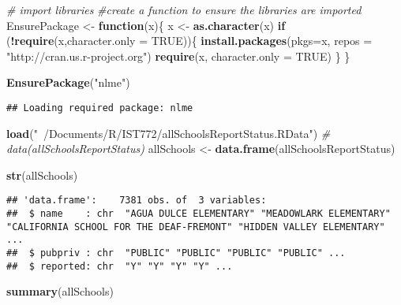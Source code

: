 \documentclass[]{article}
\newenvironment{Shaded}{\begin{snugshade}}{\end{snugshade}}
\newcommand{\CommentTok}[1]{\textcolor[rgb]{0.56,0.35,0.01}{\textit{#1}}}
\newcommand{\ControlFlowTok}[1]{\textcolor[rgb]{0.13,0.29,0.53}{\textbf{#1}}}
\newcommand{\DataTypeTok}[1]{\textcolor[rgb]{0.13,0.29,0.53}{#1}}
\newcommand{\KeywordTok}[1]{\textcolor[rgb]{0.13,0.29,0.53}{\textbf{#1}}}
\newcommand{\NormalTok}[1]{#1}
\newcommand{\OperatorTok}[1]{\textcolor[rgb]{0.81,0.36,0.00}{\textbf{#1}}}
\newcommand{\OtherTok}[1]{\textcolor[rgb]{0.56,0.35,0.01}{#1}}
\newcommand{\StringTok}[1]{\textcolor[rgb]{0.31,0.60,0.02}{#1}}
\begin{document}
\begin{Shaded}
\begin{Highlighting}[]
\CommentTok{# import libraries }
\CommentTok{#create a function to ensure the libraries are imported}
\NormalTok{EnsurePackage <-}\StringTok{ }\ControlFlowTok{function}\NormalTok{(x)\{}
\NormalTok{  x <-}\StringTok{ }\KeywordTok{as.character}\NormalTok{(x)}
    \ControlFlowTok{if}\NormalTok{ (}\OperatorTok{!}\KeywordTok{require}\NormalTok{(x,}\DataTypeTok{character.only =} \OtherTok{TRUE}\NormalTok{))\{}
      \KeywordTok{install.packages}\NormalTok{(}\DataTypeTok{pkgs=}\NormalTok{x, }\DataTypeTok{repos =} \StringTok{"http://cran.us.r-project.org"}\NormalTok{)}
      \KeywordTok{require}\NormalTok{(x, }\DataTypeTok{character.only =} \OtherTok{TRUE}\NormalTok{)}
\NormalTok{    \}}
\NormalTok{  \}}
\end{Highlighting}
\end{Shaded}

\begin{Shaded}
\begin{Highlighting}[]
\KeywordTok{EnsurePackage}\NormalTok{(}\StringTok{"nlme"}\NormalTok{)}
\end{Highlighting}
\end{Shaded}

\begin{verbatim}
## Loading required package: nlme
\end{verbatim}

\begin{Shaded}
\begin{Highlighting}[]
\KeywordTok{load}\NormalTok{(}\StringTok{"~/Documents/R/IST772/allSchoolsReportStatus.RData"}\NormalTok{)}
\CommentTok{# data(allSchoolsReportStatus)}
\NormalTok{allSchools <-}\StringTok{ }\KeywordTok{data.frame}\NormalTok{(allSchoolsReportStatus)}

\KeywordTok{str}\NormalTok{(allSchools)}
\end{Highlighting}
\end{Shaded}

\begin{verbatim}
## 'data.frame':    7381 obs. of  3 variables:
##  $ name    : chr  "AGUA DULCE ELEMENTARY" "MEADOWLARK ELEMENTARY" "CALIFORNIA SCHOOL FOR THE DEAF-FREMONT" "HIDDEN VALLEY ELEMENTARY" ...
##  $ pubpriv : chr  "PUBLIC" "PUBLIC" "PUBLIC" "PUBLIC" ...
##  $ reported: chr  "Y" "Y" "Y" "Y" ...
\end{verbatim}

\begin{Shaded}
\begin{Highlighting}[]
\KeywordTok{summary}\NormalTok{(allSchools)}
\end{Highlighting}
\end{Shaded}
\end{document}
